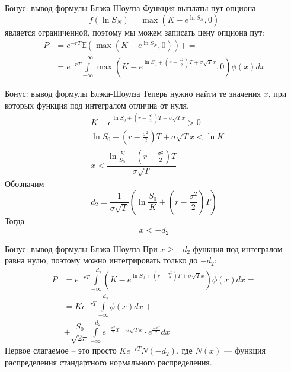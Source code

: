 \documentclass[pdf,12pt]{beamer}
\begin{document}
\begin{frame}{Бонус: вывод формулы Блэка-Шоулза}
\justify
Функция выплаты пут-опциона
\begin{equation*}
f(\ln S_N) = \max(K - e^{\ln S_N},0)
\end{equation*}
является ограниченной, поэтому мы можем записать цену опциона пут:
\begin{align*}
P &= e^{-rT}\mathbb{E}(\max(K - e^{\ln S_N},0))+ =\\
&= e^{-rT}\int\limits_{-\infty}^{+\infty}\max(K - e^{\ln S_0 + \left(r-\frac{\sigma^2}{2}\right)T + \sigma\sqrt{T}x},0) \phi(x)dx
\end{align*}
\end{frame}

\begin{frame}{Бонус: вывод формулы Блэка-Шоулза}
\justify
Теперь нужно найти те значения $x$, при которых функция под интегралом отлична от нуля.
\begin{align*}
&K - e^{\ln S_0 + \left(r-\frac{\sigma^2}{2}\right)T + \sigma\sqrt{T}x} > 0 \\
&\ln S_0 + \left(r-\frac{\sigma^2}{2}\right)T + \sigma\sqrt{T}x < \ln K \\
&x < \dfrac{\ln\frac{K}{S_0} -  \left(r-\frac{\sigma^2}{2}\right)T}{\sigma\sqrt{T}}
\end{align*}
Обозначим
\begin{equation*}
d_2 = \dfrac{1}{\sigma\sqrt{T}}\left(\ln\frac{S_0}{K} + \left(r - \frac{\sigma^2}{2}\right)T \right)
\end{equation*}
Тогда
\begin{equation*}
x < -d_2
\end{equation*}
\end{frame}

\begin{frame}{Бонус: вывод формулы Блэка-Шоулза}
\justify
При $x \ge -d_2$ функция под интегралом равна нулю, поэтому можно интегрировать только до $-d_2$:
\begin{align*}
P &= e^{-rT}\int\limits_{-\infty}^{-d_2}(K - e^{\ln S_0 + \left(r-\frac{\sigma^2}{2}\right)T + \sigma\sqrt{T}x}) \phi(x)dx = \\
&= Ke^{-rT}\int\limits_{-\infty}^{-d_2}\phi(x)dx + \\
&+ \dfrac{S_0}{\sqrt{2\pi}} \int\limits_{-\infty}^{-d_2}e^{-\frac{\sigma^2}{2}T + \sigma\sqrt{T}x} \cdot e^{\frac{-x^2}{2}}dx
\end{align*}
Первое слагаемое -- это просто $Ke^{-rT}N(-d_2)$, где $N(x)$ --- функция распределения стандартного нормального распределения.
\end{frame}
\end{document}
